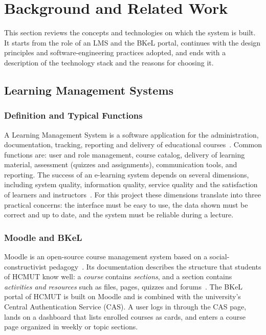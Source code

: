 \section{Background and Related Work}
\label{ch:background}

This section reviews the concepts and technologies on which the system is built. It starts from the role of an LMS and the BKeL portal, continues with the design principles and software-engineering practices adopted, and ends with a description of the technology stack and the reasons for choosing it.

\subsection{Learning Management Systems}

\subsubsection{Definition and Typical Functions}

A Learning Management System is a software application for the administration, documentation, tracking, reporting and delivery of educational courses~\cite{ellis2009field}. Common functions are: user and role management, course catalog, delivery of learning material, assessment (quizzes and assignments), communication tools, and reporting. The success of an e-learning system depends on several dimensions, including system quality, information quality, service quality and the satisfaction of learners and instructors~\cite{alfraihat2020evaluating}. For this project these dimensions translate into three practical concerns: the interface must be easy to use, the data shown must be correct and up to date, and the system must be reliable during a lecture.

\subsubsection{Moodle and BKeL}

Moodle is an open-source course management system based on a social-constructivist pedagogy~\cite{dougiamas2003moodle}. Its documentation describes the structure that students of HCMUT know well: a \emph{course} contains \emph{sections}, and a section contains \emph{activities and resources} such as files, pages, quizzes and forums~\cite{moodledocs}. The BKeL portal of HCMUT is built on Moodle and is combined with the university's Central Authentication Service (CAS). A user logs in through the CAS page, lands on a dashboard that lists enrolled courses as cards, and enters a course page organized in weekly or topic sections.

